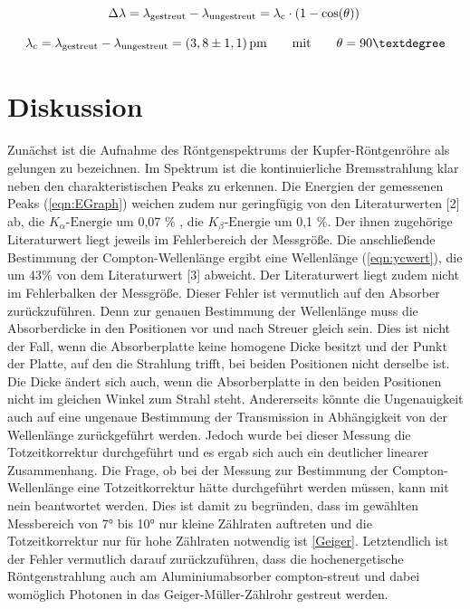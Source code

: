 \documentclass[titlepage = firstcover]{scrartcl}
\begin{document}
        \begin{equation*}
            \Delta \lambda = \lambda_{\text{gestreut}} - \lambda_{\text{ungestreut}} = \lambda_{\text{c}} \cdot \left(1 -\cos (\theta)\right) \\
            \label{eqn:ycexp}
        \end{equation*}

        \begin{equation}
            \lambda_{\text{c}} = \lambda_{\text{gestreut}} - \lambda_{\text{ungestreut}} = (3,8 \pm 1,1) \, \text{pm} \qquad \text{mit} \qquad \theta=90° \\
            \label{eqn:ycwert}
        \end{equation} 



    \section{Diskussion}
        Zunächst ist die Aufnahme des Röntgenspektrums der Kupfer-Röntgenröhre als gelungen zu bezeichnen. Im Spektrum ist die kontinuierliche Bremsstrahlung 
        klar neben den charakteristischen Peaks zu erkennen. Die Energien der gemessenen Peaks (\ref{eqn:EGraph}) weichen zudem nur geringfügig von den Literaturwerten [2] ab, 
        die $K_{\alpha}\text{-Energie}$ um 0,07 \% , die $K_{\beta}\text{-Energie}$ um 0,1 \%. Der ihnen zugehörige Literaturwert liegt jeweils im Fehlerbereich der Messgröße.
        Die anschließende Bestimmung der Compton-Wellenlänge ergibt eine Wellenlänge (\ref{eqn:ycwert}), die um 43\% von dem Literaturwert [3] abweicht. Der Literaturwert liegt zudem nicht
        im Fehlerbalken der Messgröße. Dieser Fehler ist vermutlich auf den Absorber zurückzuführen. Denn zur genauen Bestimmung der Wellenlänge muss die Absorberdicke in den Positionen vor und nach Streuer gleich sein.
        Dies ist nicht der Fall, wenn die Absorberplatte keine homogene Dicke besitzt und der Punkt der Platte, auf den die Strahlung trifft, bei beiden Positionen nicht derselbe ist. Die Dicke ändert
        sich auch, wenn die Absorberplatte in den beiden Positionen nicht im gleichen Winkel zum Strahl steht. Andererseits könnte die Ungenauigkeit auch auf eine ungenaue Bestimmung der Transmission 
        in Abhängigkeit von der Wellenlänge zurückgeführt werden. Jedoch wurde bei dieser Messung die Totzeitkorrektur durchgeführt und es ergab sich auch ein deutlicher linearer Zusammenhang. 
        Die Frage, ob bei der Messung zur Bestimmung der Compton-Wellenlänge eine Totzeitkorrektur hätte durchgeführt werden müssen, kann mit nein beantwortet werden. Dies ist damit zu begründen,
        dass im gewählten Messbereich von 7° bis 10° nur kleine Zählraten auftreten und die Totzeitkorrektur nur für hohe Zählraten notwendig ist \ref{Geiger}. Letztendlich ist der Fehler 
        vermutlich darauf zurückzuführen, dass die hochenergetische Röntgenstrahlung auch am Aluminiumabsorber compton-streut und dabei womöglich Photonen
        in das Geiger-Müller-Zählrohr gestreut werden.
\end{document}

